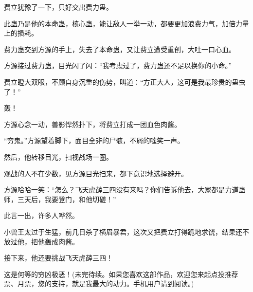 \begin{this_body}
费立犹豫了一下，只好交出费力蛊。

此蛊乃是他的本命蛊，核心蛊，能让敌人一举一动，都要更加浪费力气，加倍力量上的损耗。

费力蛊交到方源的手上，失去了本命蛊，又让费立遭受重创，大吐一口心血。

方源接过费力蛊，目光闪了闪：“我考虑过了，费力蛊还不足以换你的小命。”

费立瞪大双眼，不顾自身沉重的伤势，叫道：“方正大人，这可是我最珍贵的蛊虫了！”

轰！

方源心念一动，兽影悍然扑下，将费立打成一团血色肉酱。

“穷鬼。”方源望着脚下，面目全非的尸骸，不屑的嗤笑一声。

然后，他转移目光，扫视战场一圈。

观战的人不在少数，见方源目光扫来，都下意识地选择避开。

方源哈哈一笑：“怎么？飞天虎薛三四没有来吗？你们告诉他去，大家都是力道蛊师，三天后，我要登门，和他切磋！”

此言一出，许多人哗然。

小兽王太过于生猛，前几日杀了横眉暴君，这次又把费立打得跪地求饶，结果还不放过他，把他轰成肉酱。

接下来，他还要挑战飞天虎薛三四！

这是何等的穷凶极恶！(未完待续。如果您喜欢这部作品，欢迎您来起点投推荐票、月票，您的支持，就是我最大的动力。手机用户请到阅读。)

\end{this_body}

